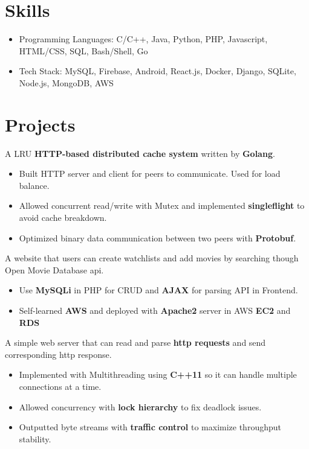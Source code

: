 \documentclass{resume}
\begin{document}
\section{Skills}
\begin{itemize}[parsep=0.5ex]
  \item Programming Languages: C/C++, Java, Python, PHP, Javascript, HTML/CSS, SQL, Bash/Shell, Go
  \item Tech Stack: MySQL, Firebase, Android, React.js, Docker, Django, SQLite, Node.js, MongoDB, AWS
\end{itemize}

\section{Projects}
 {}
  A LRU \textbf{HTTP-based distributed cache system} written by \textbf{Golang}.
\begin{itemize}
  \item Built HTTP server and client for peers to communicate. Used  for load balance.
  \item Allowed concurrent read/write with Mutex and implemented \textbf{singleflight} to avoid cache breakdown.
  \item Optimized binary data communication between two peers with \textbf{Protobuf}.
\end{itemize}

 {}
  A website that users can create watchlists and add movies by searching though Open Movie Database api.
\begin{itemize}
  \item Use \textbf{MySQLi} in PHP for CRUD and \textbf{AJAX} for parsing API in Frontend.
  \item Self-learned \textbf{AWS} and deployed with \textbf{Apache2} server in AWS \textbf{EC2} and \textbf{RDS}
\end{itemize}

 {}
  A simple web server that can read and parse \textbf{http requests} and send corresponding http response.
\begin{itemize}
  \item Implemented with Multithreading using \textbf{C++11} so it can handle multiple connections at a time.
  \item Allowed concurrency with \textbf{lock hierarchy} to fix deadlock issues.
  \item Outputted byte streams with \textbf{traffic control} to maximize throughput stability.
\end{itemize}
\end{document}

